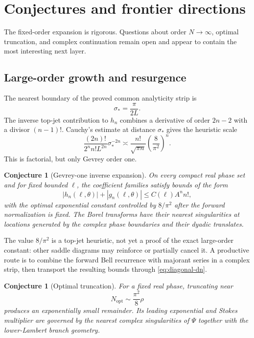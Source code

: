 \documentclass[11pt,oneside]{article}
\numberwithin{equation}{section}
\newtheorem{conjecture}[theorem]{Conjecture}
\theoremstyle{definition}
\theoremstyle{remark}
\begin{document}
\section{Conjectures and frontier directions}
\label{sec:conjectures}

The fixed-order expansion is rigorous.  Questions about order $N\to\infty$, optimal truncation, and complex continuation remain open and appear to contain the most interesting next layer.

\subsection{Large-order growth and resurgence}
The nearest boundary of the proved common analyticity strip is
\begin{equation}
 \sigma_* = \frac{\pi}{2L}.
 \label{eq:sigma-star}
\end{equation}
The inverse top-jet contribution to $h_n$ combines a derivative of order
$2n-2$ with a divisor $(n-1)!$.  Cauchy's estimate at distance $\sigma_*$ gives the heuristic scale
\begin{equation}
 \frac{(2n)!}{2^n n!L^{2n}}\sigma_*^{-2n}
 \asymp \frac{n!}{\sqrt{\pi n}}
 \left(\frac8{\pi^2}\right)^n.
 \label{eq:Gevrey-heuristic}
\end{equation}
This is factorial, but only Gevrey order one.

\begin{conjecture}[Gevrey-one inverse expansion]
\label{conj:Gevrey}
On every compact real phase set and for fixed bounded $\ell$, the coefficient families satisfy bounds of the form
\begin{equation}
 |h_n(\ell,\theta)|+|g_n(\ell,\theta)|
 \le C(\ell)A^n n!,
 \label{eq:Gevrey-bound}
\end{equation}
with the optimal exponential constant controlled by $8/\pi^2$ after the forward normalization is fixed.  The Borel transforms have their nearest singularities at locations generated by the complex phase boundaries and their dyadic translates.
\end{conjecture}

The value $8/\pi^2$ is a top-jet heuristic, not yet a proof of the exact large-order constant: other saddle diagrams may reinforce or partially cancel it.  A productive route is to combine the forward Bell recurrence with majorant series in a complex strip, then transport the resulting bounds through \cref{eq:diagonal-dn}.

\begin{conjecture}[Optimal truncation]
\label{conj:optimal-truncation}
For a fixed real phase, truncating near
\begin{equation}
 N_{\mathrm{opt}}\sim\frac{\pi^2}{8}\rho
 \label{eq:Nopt}
\end{equation}
produces an exponentially small remainder.  Its leading exponential and Stokes multiplier are governed by the nearest complex singularities of $\Psi$ together with the lower-Lambert branch geometry.
\end{conjecture}
\end{document}
